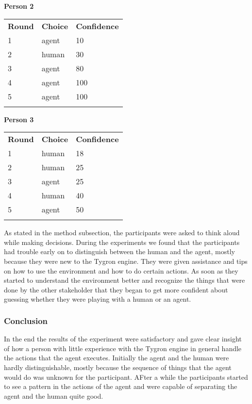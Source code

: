 \textbf{Person 2}
\begin{tabular}{lll}
\textbf{Round} & \textbf{Choice}  & \textbf{Confidence}\\ 
1 & agent  & 10        \\
2 & human  & 30         \\
3 & agent  & 80         \\
4 & agent  & 100         \\
5 & agent  & 100       \\\\
\end{tabular}

\textbf{Person 3}
\begin{tabular}{lll}
\textbf{Round} & \textbf{Choice}  & \textbf{Confidence}\\ 
1 & human  & 18         \\
2 & human  & 25         \\
3 & agent  & 25         \\
4 & human  & 40         \\
5 & agent  & 50        \\\\
\end{tabular}

As stated in the method subsection, the participants were asked to think aloud while making decisions. During the experiments we found that the participants had trouble early on to distinguish between the human and the agent, mostly because they were new to the Tygron engine. They were given assistance and tips on how to use the environment and how to do certain actions. As soon as they started to understand the environment better and recognize the things that were done by the other stakeholder that they began to get more confident about guessing whether they were playing with a human or an agent.

\subsubsection{Conclusion}
In the end the results of the experiment were satisfactory and gave clear insight of how a person with little experience with the Tygron engine in general handle the actions that the agent executes. Initially the agent and the human were hardly distinguishable, mostly because the sequence of things that the agent would do was unknown for the participant. AFter a while the participants started to see a pattern in the actions of the agent and were capable of separating the agent and the human quite good.

